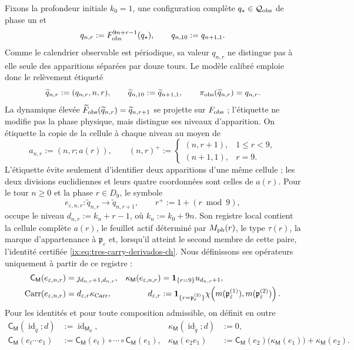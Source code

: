 Fixons la profondeur initiale \(k_0=1\), une configuration complète
\(q_\star\in\mathcal Q_{\rm obs}\) de phase un et
\[
 q_{n,r}:=F_{\rm obs}^{9n+r-1}(q_\star),\qquad
 q_{n,10}:=q_{n+1,1}.
\]
Comme le calendrier observable est périodique, sa valeur \(q_{n,r}\) ne
distingue pas à elle seule des apparitions séparées par douze tours. Le modèle
calibré emploie donc le relèvement étiqueté
\[
 \widetilde q_{n,r}:=(q_{n,r},n,r),\qquad
 \widetilde q_{n,10}:=\widetilde q_{n+1,1},\qquad
 \pi_{\rm obs}(\widetilde q_{n,r})=q_{n,r}.
\]
La dynamique élevée \(\widetilde F_{\rm obs}(\widetilde q_{n,r})
=\widetilde q_{n,r+1}\) se projette sur \(F_{\rm obs}\) ; l'étiquette ne modifie pas la phase physique, mais distingue ses niveaux d'apparition. On étiquette la copie de la cellule à chaque niveau au moyen de
\[
 a_{n,r}:=(n,r;a(r)),\qquad
 (n,r)^+:=
 \begin{cases}
  (n,r+1),&1\le r<9,\\
  (n+1,1),&r=9.
 \end{cases}
\]
L’étiquette évite seulement d’identifier deux apparitions d’une même cellule ; les
deux divisions euclidiennes et leurs quatre coordonnées sont celles de \(a(r)\).
Pour le tour \(n\ge0\) et la phase \(r\in D_9\), le symbole
\[
 e_{\varepsilon,n,r}:\widetilde q_{n,r}
 \longrightarrow\widetilde q_{n,r+1},
 \qquad r^+:=1+(r\bmod9),
\]
occupe le niveau \(d_{n,r}:=k_n+r-1\), où \(k_n:=k_0+9n\). Son registre local contient la cellule complète \(a(r)\), le feuillet actif déterminé par \(M_{\rm ph}(r)\), le type \(\tau(r)\), la marque d'appartenance à \(\mathfrak p_\varepsilon\) et, lorsqu'il atteint le second membre de cette paire, l'identité certifiée \eqref{ix:eq:tres-carry-derivados-ch}. Nous définissons ses opérateurs uniquement à partir de ce registre :
\begin{align}
 \mathsf C_{\mathsf M}(e_{\varepsilon,n,r})
   &=\jmath_{d_{n,r}+1,d_{n,r}},&
 \kappa_{\mathsf M}(e_{\varepsilon,n,r})
   &=\mathbf1_{\{r=9\}}u_{d_{n,r}+1},
 \label{ix:eq:memoria-arista-ch}\\
       \operatorname{Carr}(e_{\varepsilon,n,r})
   &=d_{\varepsilon,r}\kappa_{\rm Carr},&
 d_{\varepsilon,r}
   &:=\mathbf1_{\{r=\mathfrak p_\varepsilon^{(2)}\}}
       \chi\!\left(m(\mathfrak p_\varepsilon^{(1)}),
                    m(\mathfrak p_\varepsilon^{(2)})\right).
 \label{ix:eq:carry-arista-derivado-ch}
\end{align}
Pour les identités et pour toute composition admissible, on définit en outre
\begin{align}
 \mathsf C_{\mathsf M}(\operatorname{id}_{\widetilde q};d)
   &:=\operatorname{id}_{\mathsf M_d},&
 \kappa_{\mathsf M}(\operatorname{id}_{\widetilde q};d)&:=0,
 \label{ix:eq:memoria-identidad-ch}\\
 \mathsf C_{\mathsf M}(e_t\cdots e_1)
   &:=\mathsf C_{\mathsf M}(e_t)\circ\cdots\circ
      \mathsf C_{\mathsf M}(e_1),&
 \kappa_{\mathsf M}(e_2e_1)
   &:=\mathsf C_{\mathsf M}(e_2)
        \bigl(\kappa_{\mathsf M}(e_1)\bigr)
      +\kappa_{\mathsf M}(e_2).
 \label{ix:eq:cociclo-memoria-calibrado-ch}
\end{align}
